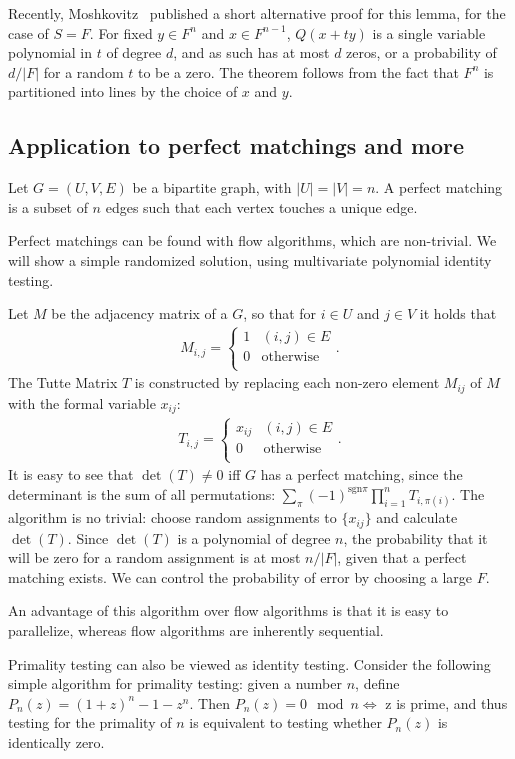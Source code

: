 \documentclass{article}
\begin{document}
Recently, Moshkovitz~\cite{Moshkovitz:2010} published a short
alternative proof for this lemma, for the case of $S=F$. For fixed $y
\in F^n$ and $x \in F^{n-1}$, $Q(x+ty)$ is a single variable
polynomial in $t$ of degree $d$, and as such has at most $d$ zeros, or
a probability of $d/|F|$ for a random $t$ to be a zero. The theorem
follows from the fact that $F^n$ is partitioned into lines by the
choice of $x$ and $y$.


\subsection{Application to perfect matchings and more}
Let $G=(U,V,E)$ be a bipartite graph, with $|U|=|V|=n$. A perfect
matching is a subset of $n$ edges such that each vertex touches a
unique edge.

Perfect matchings can be found with flow algorithms, which are
non-trivial. We will show a simple randomized solution, using
multivariate polynomial identity testing.

Let $M$ be the adjacency matrix of a $G$, so that for $i \in U$ and $j
\in V$ it holds that
\begin{align*}
M_{i,j}=
\begin{cases}
  1 & (i,j)\in E \\
  0 & \mathrm{otherwise} \\
\end{cases}.  
\end{align*}
The Tutte Matrix $T$ is constructed by replacing each non-zero element
$M_{ij}$ of $M$ with the formal variable $x_{ij}$:
\begin{align*}
T_{i,j}=
\begin{cases}
  x_{ij} & (i,j)\in E \\
  0 & \mathrm{otherwise} \\
\end{cases}.  
\end{align*}
It is easy to see that $\det(T)\neq 0$ iff $G$ has a perfect matching,
since the determinant is the sum of all permutations:
$\sum_{\pi}(-1)^{\mathrm{sgn} \pi}\prod_{i=1}^{n}T_{i,\pi(i)}$.  The algorithm
is no trivial: choose random assignments to $\{x_{ij}\}$ and calculate
$\det(T)$. Since $\det(T)$ is a polynomial of degree $n$, the
probability that it will be zero for a random assignment is at most
$n/|F|$, given that a perfect matching exists. We can control the
probability of error by choosing a large $F$.

An advantage of this algorithm over flow algorithms is that it is easy
to parallelize, whereas flow algorithms are inherently sequential. 


Primality testing can also be viewed as identity testing. Consider the
following simple algorithm for primality testing: given a number $n$,
define $P_n(z)=(1+z)^{n}-1-z^n$. Then $P_n(z)=0 \mod n \iff$ z is
prime, and thus testing for the primality of $n$ is equivalent to
testing whether $P_n(z)$ is identically zero.

 
\end{document}
